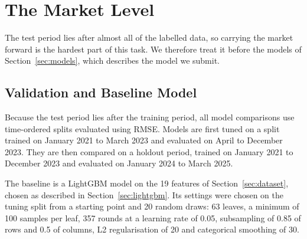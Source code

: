\section{The Market Level}

The test period lies after almost all of the labelled data, so carrying the market forward is the hardest part of this task. We therefore treat it before the models of Section~\ref{sec:models}, which describes the model we submit.

\subsection{Validation and Baseline Model}
\label{sec:holdout}

Because the test period lies after the training period, all model comparisons use time-ordered splits evaluated using RMSE. Models are first tuned on a split trained on January 2021 to March 2023 and evaluated on April to December 2023. They are then compared on a holdout period, trained on January 2021 to December 2023 and evaluated on January 2024 to March 2025.

The baseline is a LightGBM model on the 19 features of Section~\ref{sec:dataset}, chosen as described in Section~\ref{sec:lightgbm}. Its settings were chosen on the tuning split from a starting point and 20 random draws: 63 leaves, a minimum of 100 samples per leaf, 357 rounds at a learning rate of 0.05, subsampling of 0.85 of rows and 0.5 of columns, L2 regularisation of 20 and categorical smoothing of 30.




